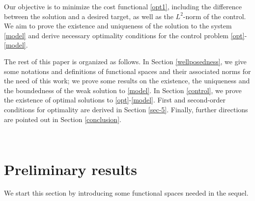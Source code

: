 \documentclass[reqno,twoside]{amsart}
\numberwithin{equation}{section}
\theoremstyle{definition}
\numberwithin{equation}{section}
\begin{document}
Our objective is to minimize the cost functional \eqref{opt1},  including the difference between the solution and a desired target, as well as the $L^2$-norm of the control. We aim to prove the existence and uniqueness of the solution to the system \eqref{model} and derive necessary optimality conditions for the control problem \eqref{opt}-\eqref{model}. 

The rest of this paper is organized as follows. In Section \ref{wellposedness}, we give some notations and definitions of functional spaces and their associated norms for the need of this work; we prove some results on the existence, the uniqueness and the boundedness of the weak solution to \eqref{model}. In Section \ref{control}, we prove the existence of  optimal solutions to \eqref{opt}-\eqref{model}. First and second-order conditions for optimality are derived in Section  \ref{sec-5}. Finally, further directions are pointed out in Section \ref{conclusion}.






\



\section{Preliminary results\label{wellposedness}}
We start this section by introducing some functional spaces needed in the sequel.
\end{document}
